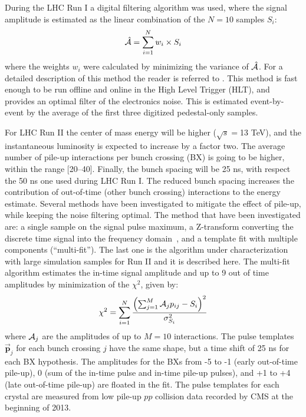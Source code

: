 \documentclass[journal]{IEEEtran}
\begin{document}
During the LHC Run I a digital filtering algorithm was used, where the signal amplitude is estimated as the linear combination of the $N=10$ samples $S_i$:
%
\begin{equation}
\hat{\cal A}=\sum_{i=1}^{N} w_i \times S_i
\end{equation}
%
where the weights $w_i$ were calculated by minimizing the variance of $\hat{\cal A}$. For a detailed description of this method the reader is referred to \cite{Bruneliere:2006ra}. This method is fast enough to be run offline and online in the High Level Trigger (HLT), and provides an optimal filter of the electronics noise. This is estimated event-by-event by the average of the first three digitized pedestal-only samples.

For LHC Run II the center of mass energy will be higher ($\sqrt{s}=$13 TeV), and the instantaneous luminosity is expected to increase by a factor two. The average number of pile-up interactions per bunch crossing (BX) is going to be higher, within the range [20--40]. Finally, the bunch spacing will be 25 ns, with respect the 50 ns one used during LHC Run I. The reduced bunch spacing increases the contribution of out-of-time (other bunch crossing) interactions to the energy estimate. Several methods have been investigated to mitigate the effect of pile-up, while keeping the noise filtering optimal. The method that have been investigated are: a single sample on the signal pulse maximum, a Z-transform converting the discrete time signal into the frequency domain~\cite{Gadomski:1992xu}, and a template fit with multiple components (``multi-fit''). The last one is the algorithm under characterization with large simulation samples for Run II and it is described here.
The multi-fit algorithm estimates the in-time signal amplitude and up to 9 out of time amplitudes by minimization of the $\chi^2$, given by:
\begin{equation}
\label{eqn:chi2multifit}
\chi^2 = \sum_{i=1}^{N} \frac{\left(\sum_{j=1}^M {\cal A}_{j}p_{ij} - S_i \right)^2}{\sigma^2_{S_i}}
\end{equation}
where ${\cal A}_{j}$ are the amplitudes of up to $M=10$ interactions. The pulse templates $\mathbf{\vec p}_j$ for each bunch crossing $j$ have the same shape, but a time shift of 25 ns for each BX hypothesis. The amplitudes for the BXs from -5 to -1 (early out-of-time pile-up), 0 (sum of the in-time pulse and in-time pile-up pulses), and +1 to +4 (late out-of-time pile-up) are floated in the fit.
The pulse templates for each crystal are measured from low pile-up $pp$ collision data recorded by CMS at the beginning of 2013. 
\end{document}
